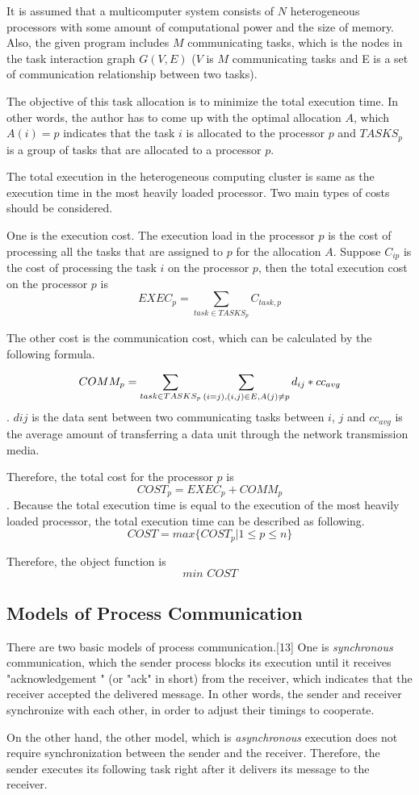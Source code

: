 It is assumed that a multicomputer system consists of $N$ heterogeneous processors with some amount of computational power and the size of memory.  Also, the given program includes $M$ communicating tasks, which is the nodes in the task interaction graph $G(V, E)$ ($V$ is $M$ communicating tasks and E is a set of communication relationship between two tasks).

The objective of this task allocation is to minimize the total execution time. In other words, the author has to come up with the optimal allocation $A$, which $A(i) = p$ indicates that the task $i$ is allocated to the processor $p$ and $TASKS_p$ is a group of tasks that are allocated to a processor $p$.

 The total execution in the heterogeneous computing cluster is same as the execution time in the most heavily loaded processor.  Two main types of costs should be considered.
 
 One is the execution cost.  The execution load in the processor $p$ is the cost of processing all the tasks that are assigned to $p$ for the allocation $A$. Suppose $C_{ip}$ is the cost of processing the task $i$ on the processor $p$, then the total execution cost on the processor $p$ is $$EXEC_p = \sum_{task \in  TASKS_p} C_{task, p}$$
 
  The other cost is the communication cost, which can be calculated by the following formula.
  
  $$COMM_p = \sum_{task \in TASKS_p} \sum_{(i=j), \\(i, j) \in E , \\ A(j) \neq p} d_{ij} * cc_{avg}$$. $d{ij}$ is the data sent between two communicating tasks between $i$, $j$ and $cc_{avg}$ is the average amount of transferring a data unit through the network transmission media.
  
 Therefore, the total cost for the processor $p$ is $$COST_p = EXEC_p + COMM_p$$.
 Because the total execution time is equal to the execution of the most heavily loaded processor, the total execution time can be described as following.
 $$ COST =  max \{COST_p | 1 \leq p \leq n\}$$
 
 Therefore, the object function is $$min \,\,COST$$


\subsection{Models of Process Communication}

There are two basic models of process communication.[13] One is \textit{synchronous} communication, which the sender process blocks its execution until it receives "acknowledgement " (or "ack" in short) from the receiver, which indicates that the receiver accepted the delivered message. In other words, the sender and receiver synchronize with each other, in order to adjust their timings to cooperate.
\par On the other hand, the other model, which is \textit{asynchronous} execution does not require synchronization between the sender and the receiver.  Therefore, the sender executes its following task right after it delivers its message to the receiver. 

